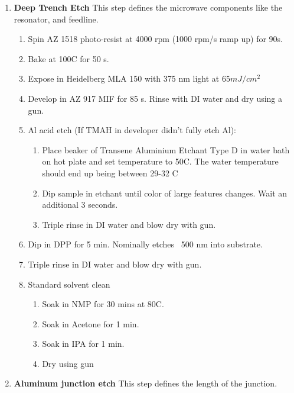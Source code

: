 \begin{enumerate}
\begin{enumerate}
\begin{enumerate}
            \end{enumerate}
            
        \end{enumerate}
    \item \textbf{Deep Trench Etch} This step defines the microwave components like the resonator, and feedline.
    \begin{enumerate}
        \item Spin AZ 1518 photo-resist at 4000 rpm (1000 rpm/s ramp up) for 90s.
        \item Bake at 100\degree C for 50 s.
        \item Expose in Heidelberg MLA 150 with 375 nm light at $65mJ/cm^2 $
        \item Develop in AZ 917 MIF for 85 s. Rinse with DI water and dry using a  gun.
        \item Al acid etch (If TMAH in developer didn't fully etch Al):
        \begin{enumerate}
            \item Place beaker of Transene Aluminium Etchant Type D in water bath on hot plate and set temperature to 50\degree C. The water temperature should end up being between 29-32 \degree C
            \item Dip sample in etchant until color of large features changes. Wait an additional 3 seconds.
            \item Triple rinse in DI water and blow dry with  gun.
        \end{enumerate}
        \item Dip in DPP for 5 min. Nominally etches ~500 nm into substrate.
        \item Triple rinse in DI water and blow dry with  gun.
        \item Standard solvent clean
        \begin{enumerate}
            \item Soak in NMP for 30 mins at 80\degree C.
            \item Soak in Acetone for 1 min.
            \item Soak in IPA for 1 min.
            \item Dry using  gun
        \end{enumerate}
    \end{enumerate}
    \item \textbf{Aluminum junction etch} This step defines the length of the junction.
    \begin{enumerate}

\end{enumerate}
\end{enumerate}
